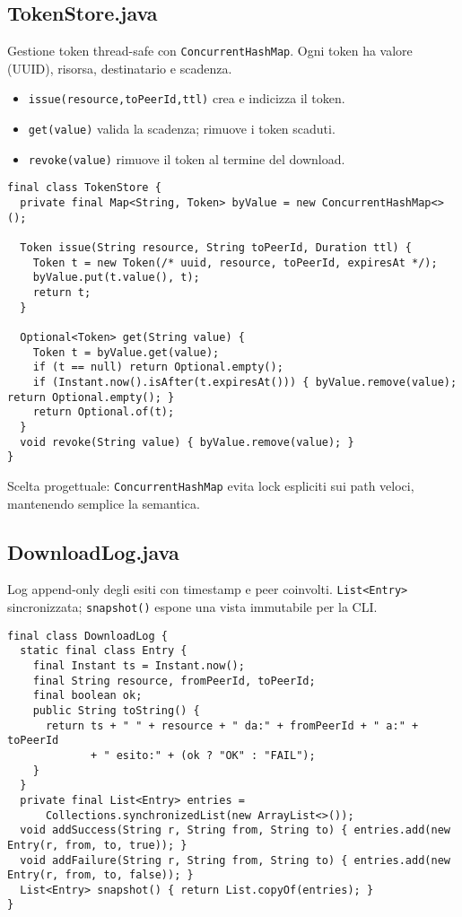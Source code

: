 \documentclass[a4paper,12pt]{article}
\begin{document}
\subsection*{TokenStore.java}
Gestione token thread-safe con \texttt{ConcurrentHashMap}. Ogni token ha valore (UUID), risorsa, destinatario e scadenza.
\begin{itemize}[nosep]
  \item \texttt{issue(resource,toPeerId,ttl)} crea e indicizza il token.
  \item \texttt{get(value)} valida la scadenza; rimuove i token scaduti.
  \item \texttt{revoke(value)} rimuove il token al termine del download.
\end{itemize}

\begin{lstlisting}
final class TokenStore {
  private final Map<String, Token> byValue = new ConcurrentHashMap<>();

  Token issue(String resource, String toPeerId, Duration ttl) {
    Token t = new Token(/* uuid, resource, toPeerId, expiresAt */);
    byValue.put(t.value(), t);
    return t;
  }

  Optional<Token> get(String value) {
    Token t = byValue.get(value);
    if (t == null) return Optional.empty();
    if (Instant.now().isAfter(t.expiresAt())) { byValue.remove(value); return Optional.empty(); }
    return Optional.of(t);
  }
  void revoke(String value) { byValue.remove(value); }
}
\end{lstlisting}

Scelta progettuale: \texttt{ConcurrentHashMap} evita lock espliciti sui path veloci, mantenendo semplice la semantica.

\subsection*{DownloadLog.java}
Log append-only degli esiti con timestamp e peer coinvolti. \texttt{List<Entry>} sincronizzata; \texttt{snapshot()} espone una vista immutabile per la CLI.
\begin{lstlisting}
final class DownloadLog {
  static final class Entry {
    final Instant ts = Instant.now();
    final String resource, fromPeerId, toPeerId;
    final boolean ok;
    public String toString() {
      return ts + " " + resource + " da:" + fromPeerId + " a:" + toPeerId
             + " esito:" + (ok ? "OK" : "FAIL");
    }
  }
  private final List<Entry> entries =
      Collections.synchronizedList(new ArrayList<>());
  void addSuccess(String r, String from, String to) { entries.add(new Entry(r, from, to, true)); }
  void addFailure(String r, String from, String to) { entries.add(new Entry(r, from, to, false)); }
  List<Entry> snapshot() { return List.copyOf(entries); }
}
\end{lstlisting}
\end{document}
